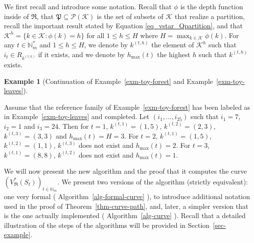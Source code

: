 \documentclass[
  11pt,
  a4paper,
]{article}
\theoremstyle{plain}
\theoremstyle{definition}
\newtheorem{example}{Example}[section]
\theoremstyle{plain}
\theoremstyle{definition}
\theoremstyle{plain}
\theoremstyle{remark}
\begin{document}
We first recall and introduce some notation. Recall that \(\phi\) is the
depth function inside of \(\mathfrak{R}\), that
\(\mathfrak P \subseteq \mathcal P(\mathcal{K})\) is the set of subsets
of \(\mathcal{K}\) that realize a partition, recall the important result
stated by Equation \eqref{eq_vstar_Qpartition}, and that
\(\mathcal{K}^h=\{ k\in\mathcal{K}: \phi(k)=h  \}\) for all
\(1\leq h\leq H\) where \(H=\max_{k\in\mathcal{K}}\phi(k)\). For any
\(t\in\mathbb{N}_m^*\) and \(1\leq h\leq H\), we denote by \(k^{(t,h)}\)
the element of \(\mathcal{K}^h\) such that \(i_t\in R_{k^{(t,h)}}\) if
it exists, and we denote by \(h_{\max}(t)\) the highest \(h\) such that
\(k^{(t,h)}\) exists.

\begin{example}[Continuation of Example~\ref{exm-toy-forest} and
Example~\ref{exm-toy-leaves}]\protect\hypertarget{exm-kth}{}\label{exm-kth}

Assume that the reference family of Example~\ref{exm-toy-forest} has
been labeled as in Example~\ref{exm-toy-leaves} and completed. Let
\((i_1,\dotsc, i_{25})\) such that \(i_1=7\), \(i_2=1\) and \(i_3=24\).
Then for \(t=1\), \(k^{(t,1)}=(1,5)\), \(k^{(t,2)}=(2,3)\),
\(k^{(t,3)}=(3,3)\) and \(h_{\max}(t)=H=3\). For \(t=2\),
\(k^{(t,1)}=(1,5)\), \(k^{(t,2)}=(1,1)\), \(k^{(t,3)}\) does not exist
and \(h_{\max}(t)=2\). For \(t=3\), \(k^{(t,1)}=(8,8)\), \(k^{(t,2)}\)
does not exist and \(h_{\max}(t)=1\).

\end{example}

We will now present the new algorithm and the proof that it computes the
curve \((V^*_{\mathfrak{R}}(S_t))_{t\in\mathbb{N}_m}\). We present two
versions of the algorithm (strictly equivalent): one very formal
( Algorithm~\ref{alg-formal-curve} ), to introduce additional notation
used in the proof of Theorem~\ref{thm-curve-path}, and, later, a simpler
version that is the one actually implemented
( Algorithm~\ref{alg-curve} ). Recall that a detailed illustration of
the steps of the algorithms will be provided in
Section~\ref{sec-example}.
\end{document}
